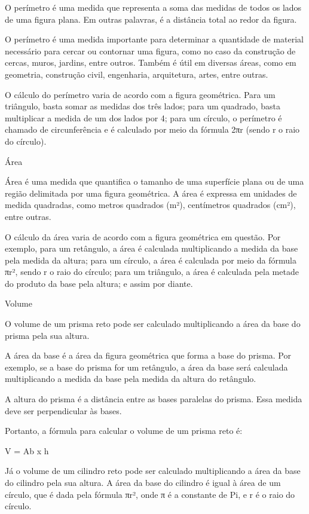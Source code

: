 O perímetro é uma medida que representa a soma das medidas de todos os
lados de uma figura plana. Em outras palavras, é a distância total ao
redor da figura.

O perímetro é uma medida importante para determinar a quantidade de
material necessário para cercar ou contornar uma figura, como no caso da
construção de cercas, muros, jardins, entre outros. Também é útil em
diversas áreas, como em geometria, construção civil, engenharia,
arquitetura, artes, entre outras.

O cálculo do perímetro varia de acordo com a figura geométrica. Para um
triângulo, basta somar as medidas dos três lados; para um quadrado,
basta multiplicar a medida de um dos lados por 4; para um círculo, o
perímetro é chamado de circunferência e é calculado por meio da fórmula
2πr (sendo r o raio do círculo).

Área

Área é uma medida que quantifica o tamanho de uma superfície plana ou de
uma região delimitada por uma figura geométrica. A área é expressa em
unidades de medida quadradas, como metros quadrados (m²), centímetros
quadrados (cm²), entre outras.

O cálculo da área varia de acordo com a figura geométrica em questão.
Por exemplo, para um retângulo, a área é calculada multiplicando a
medida da base pela medida da altura; para um círculo, a área é
calculada por meio da fórmula πr², sendo r o raio do círculo; para um
triângulo, a área é calculada pela metade do produto da base pela
altura; e assim por diante.

Volume

O volume de um prisma reto pode ser calculado multiplicando a área da
base do prisma pela sua altura.

A área da base é a área da figura geométrica que forma a base do prisma.
Por exemplo, se a base do prisma for um retângulo, a área da base será
calculada multiplicando a medida da base pela medida da altura do
retângulo.

A altura do prisma é a distância entre as bases paralelas do prisma.
Essa medida deve ser perpendicular às bases.

Portanto, a fórmula para calcular o volume de um prisma reto é:

V = Ab x h

Já o volume de um cilindro reto pode ser calculado multiplicando a área
da base do cilindro pela sua altura. A área da base do cilindro é igual
à área de um círculo, que é dada pela fórmula πr², onde π é a constante
de Pi, e r é o raio do círculo.

